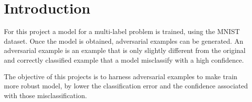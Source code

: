 \section{Introduction}

For this project a model for a multi-label problem is trained, using the MNIST dataset. Once the model is obtained, adversarial examples can be generated. An adversarial example is an example that is only slightly different from the original and correctly classified example that a model misclassify with a high confidence.

The objective of this projects is to harness adversarial examples to make train more robust model, by lower the classification error and the confidence associated with those misclassification.